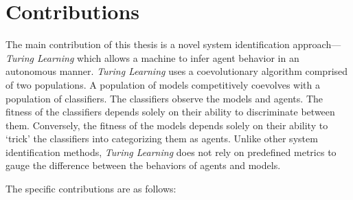 
\section{Contributions}

The main contribution of this thesis is a novel system identification approach---\textit{Turing Learning} which allows a machine to infer agent behavior in an autonomous manner. \textit{Turing Learning} uses a coevolutionary algorithm comprised of two populations. A population of models competitively coevolves with a population of classifiers. The classifiers observe the models and agents. The fitness of the classifiers depends solely on their ability to discriminate between them. Conversely, the fitness of the models depends solely on their ability to `trick' the classifiers into categorizing them as agents. Unlike other system identification methods, \textit{Turing Learning} does not rely on predefined metrics to gauge the difference between the behaviors of agents and models. 

The specific contributions are as follows:

